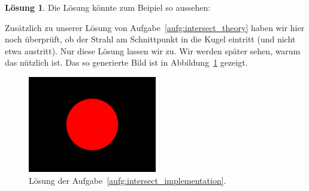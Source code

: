 \documentclass[12pt,a4paper]{article}
\theoremstyle{definition}
\theoremstyle{definition}
\newtheorem*{losung*}{Lösung}
\begin{document}
	\begin{losung*}
		Die Lösung könnte zum Beipiel so aussehen:
		
		Zusätzlich zu unserer Lösung von Aufgabe~\ref{aufg:intersect_theory} haben wir hier noch überprüft, ob der Strahl am Schnittpunkt in die Kugel eintritt (und nicht etwa austritt).
		Nur diese Lösung lassen wir zu.
		Wir werden später sehen, warum das nützlich ist.
		Das so generierte Bild ist in Abbildung~\ref{fig:solution_sphere} gezeigt.
		\begin{figure}[ht]
			\centering
			\includegraphics[width=0.5\textwidth]{images/getting_started.png}
			\caption{Lösung der Aufgabe~\ref{aufg:intersect_implementation}.}
			\label{fig:solution_sphere}
		\end{figure}
	\end{losung*}
\end{document}
